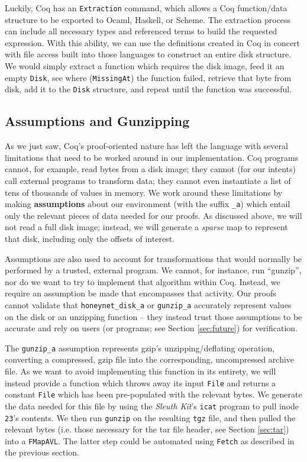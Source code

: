 \documentclass[nocopyrightspace,preprint]{sigplanconf}
\begin{document}
Luckily, Coq has an {\tt Extraction} command, which allows a Coq function/data
structure to be exported to Ocaml, Haskell, or Scheme. The extraction process
can include all necessary types and referenced terms to build the requested
expression. With this ability, we can use the definitions created in Coq in
concert with file access built into those languages to construct an entire
disk structure. We would simply extract a function which requires the disk
image, feed it an empty {\tt Disk}, see where ({\tt MissingAt}) the function
failed, retrieve that byte from disk, add it to the {\tt Disk} structure, and
repeat until the function was successful.

\subsection{Assumptions and Gunzipping}
\label{subsec:gunzip}

As we just saw, Coq's proof-oriented nature has left the language with several
limitations that need to be worked around in our implementation. Coq programs
cannot, for example, read bytes from a disk image; they cannot (for our
intents) call external programs to transform data; they cannot even
instantiate a list of tens of thousands of values in memory. We work around
these limitations by making {\bf assumptions} about our environment (with the
suffix {\tt \_a}) which entail only the relevant pieces of data needed for our
proofs. As discussed above, we will not read a full disk image; instead, we
will generate a {\it sparse} map to represent that disk, including only the
offsets of interest.

Assumptions are also used to account for transformations that would normally
be performed by a trusted, external program. We cannot, for instance, run
``gunzip'', nor do we want to try to implement that algorithm within Coq.
Instead, we require an assumption be made that encompasses that activity. Our
proofs cannot validate that {\tt honeynet\_disk\_a} or {\tt gunzip\_a}
accurately represent values on the disk or an unzipping function -- they
instead trust those assumptions to be accurate and rely on users (or programs;
see Section \ref{sec:future}) for verification.

The {\tt gunzip\_a} assumption represents gzip's unzipping/deflating
operation, converting a compressed, gzip file into the corresponding,
uncompressed archive file. As we want to avoid implementing this function in
its entirety, we will instead provide a function which throws away its input
{\tt File} and returns a constant {\tt File} which has been pre-populated with
the relevant bytes. We generate the data needed for this file by using the
{\it Sleuth Kit}'s {\tt icat} program to pull inode {\tt 23}'s contents. We
then run {\tt gunzip} on the resulting {\tt tgz} file, and then pulled the
relevant bytes (i.e. those necessary for the tar file header, see Section
\ref{sec:tar}) into a {\tt FMapAVL}. The latter step could be automated using
{\tt Fetch} as described in the previous section.
\end{document}
